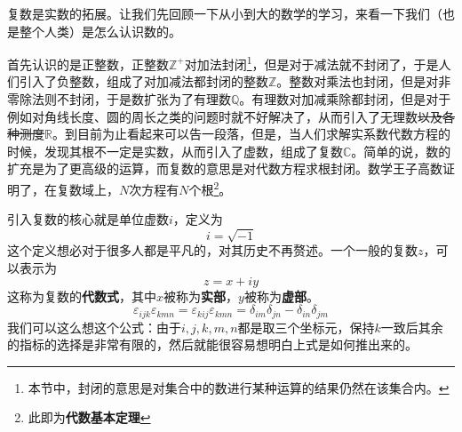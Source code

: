 \documentclass[12pt,a4paper,openany,twoside]{book}
\numberwithin{equation}{section}
\begin{document}
          复数是实数的拓展。让我们先回顾一下从小到大的数学的学习，来看一下我们（也是整个人类）是怎么认识数的。
          
          首先认识的是正整数，正整数$\mathbb{Z}^+$对加法封闭\footnote{本节中，封闭的意思是对集合中的数进行某种运算的结果仍然在该集合内。}，但是对于减法就不封闭了，于是人们引入了负整数，组成了对加减法都封闭的整数$\mathbb{Z}$。整数对乘法也封闭，但是对非零除法则不封闭，于是数扩张为了有理数$\mathbb{Q}$。有理数对加减乘除都封闭，但是对于例如对角线长度、圆的周长之类的问题时就不好解决了，从而引入了无理数\sout{以及各种测度}$\mathbb{R}$。到目前为止看起来可以告一段落，但是，当人们求解实系数代数方程的时候，发现其根不一定是实数，从而引入了虚数，组成了复数$\mathbb{C}$。简单的说，数的扩充是为了更高级的运算，而复数的意思是对代数方程求根封闭。数学王子高数证明了，在复数域上，$N$次方程有$N$个根\footnote{此即为\textbf{代数基本定理}}。
          
          引入复数的核心就是单位虚数$i$，定义为
          \begin{equation}
            i=\sqrt{-1}
          \end{equation}
          这个定义想必对于很多人都是平凡的，对其历史不再赘述。一个一般的复数$z$，可以表示为
          \begin{equation}
            z=x+iy
          \end{equation}
          这称为复数的\textbf{代数式}，其中$x$被称为\textbf{实部}，$y$被称为\textbf{虚部}。
          \begin{equation}
            \varepsilon_{ijk}\varepsilon_{kmn} = \varepsilon_{kij} \varepsilon_{kmn} = \delta_{im} \delta_{jn} - \delta_{in}\delta_{jm}
          \end{equation} 
          我们可以这么想这个公式：由于$i,j,k,m,n$都是取三个坐标元，保持$k$一致后其余的指标的选择是非常有限的，然后就能很容易想明白上式是如何推出来的。
\end{document}
